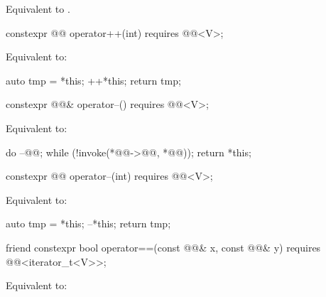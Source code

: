 \begin{itemdescr}
\pnum
\effects
Equivalent to .
\end{itemdescr}

%
\begin{itemdecl}
constexpr @@ operator++(int) requires @@<V>;
\end{itemdecl}

\begin{itemdescr}
\pnum
\effects
Equivalent to:
\begin{codeblock}
auto tmp = *this;
++*this;
return tmp;
\end{codeblock}
\end{itemdescr}

%
\begin{itemdecl}
constexpr @@& operator--() requires @@<V>;
\end{itemdecl}

\begin{itemdescr}
\pnum
\effects
Equivalent to:
\begin{codeblock}
do
  --@@;
while (!invoke(*@@->@@, *@@));
return *this;
\end{codeblock}
\end{itemdescr}

%
\begin{itemdecl}
constexpr @@ operator--(int) requires @@<V>;
\end{itemdecl}

\begin{itemdescr}
\pnum
\effects
Equivalent to:
\begin{codeblock}
auto tmp = *this;
--*this;
return tmp;
\end{codeblock}
\end{itemdescr}

%
\begin{itemdecl}
friend constexpr bool operator==(const @@& x, const @@& y)
  requires @@<iterator_t<V>>;
\end{itemdecl}

\begin{itemdescr}
\pnum
\effects
Equivalent to: 
\end{itemdescr}

